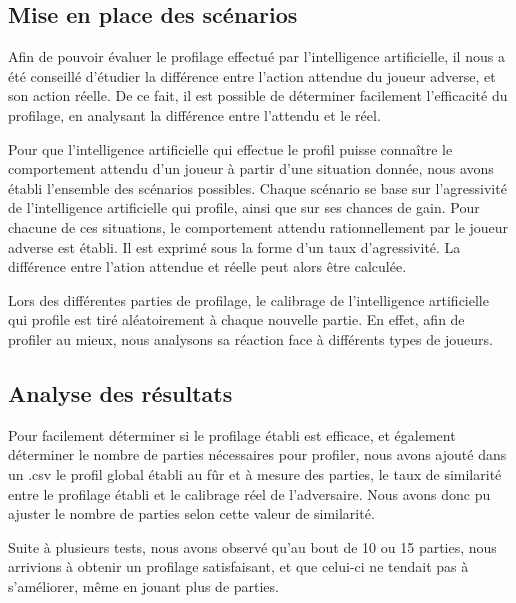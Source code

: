 \documentclass{report}
\begin{document}
\subsection{Mise en place des scénarios}

\hspace{0.5cm}Afin de pouvoir évaluer le profilage effectué par l'intelligence artificielle, il nous a été conseillé d'étudier la différence entre l'action attendue du joueur adverse, et son action réelle. De ce fait, il est possible de déterminer facilement l'efficacité du profilage, en analysant la différence entre l'attendu et le réel.\par
Pour que l'intelligence artificielle qui effectue le profil puisse connaître le comportement attendu d'un joueur à partir d'une situation donnée, nous avons établi l'ensemble des scénarios possibles. Chaque scénario se base sur l'agressivité de l'intelligence artificielle qui profile, ainsi que sur ses chances de gain. Pour chacune de ces situations, le comportement attendu rationnellement par le joueur adverse est établi. Il est exprimé sous la forme d'un taux d'agressivité. La différence entre l'ation attendue et réelle peut alors être calculée.


Lors des différentes parties de profilage, le calibrage de l'intelligence artificielle qui profile est tiré aléatoirement à chaque nouvelle partie. En effet, afin de profiler au mieux, nous analysons sa réaction face à différents types de joueurs.\par

\subsection{Analyse des résultats}

\hspace{0.5cm}Pour facilement déterminer si le profilage établi est efficace, et également déterminer le nombre de parties nécessaires pour profiler, nous avons ajouté dans un .csv le profil global établi au fûr et à mesure des parties, le taux de similarité entre le profilage établi et le calibrage réel de l'adversaire. Nous avons donc pu ajuster le nombre de parties selon cette valeur de similarité.\par
Suite à plusieurs tests, nous avons observé qu'au bout de 10 ou 15 parties, nous arrivions à obtenir un profilage satisfaisant, et que celui-ci ne tendait pas à s'améliorer, même en jouant plus de parties.\\
	
\end{document}
